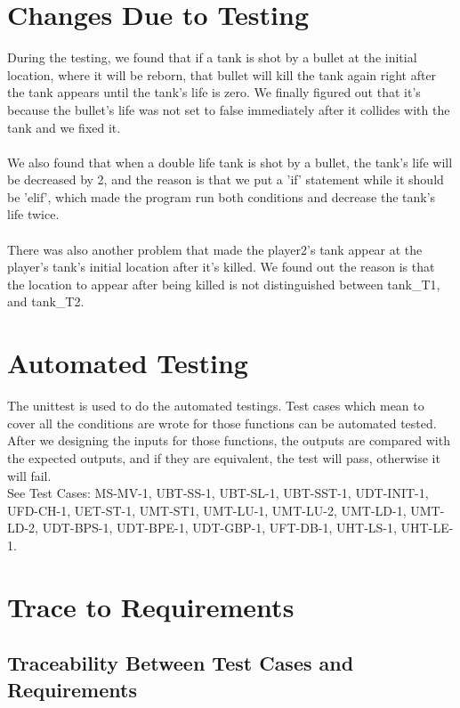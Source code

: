 \documentclass[12pt, titlepage]{article}
\begin{document}
\section{Changes Due to Testing}
During the testing, we found that if a tank is shot by a bullet at the initial location, where it will be reborn, that bullet will kill the tank again right after the tank appears until the tank's life is zero. We finally figured out that it's because the bullet's life was not set to false immediately after it collides with the tank and we fixed it.\\\\
We also found that when a double life tank is shot by a bullet, the tank's life will be decreased by 2, and the reason is that we put a 'if' statement while it should be 'elif', which made the program run both conditions and decrease the tank's life twice.\\\\
There was also another problem that made the player2's tank appear at the player's tank's initial location after it's killed. We found out the reason is that the location to appear after being killed is not distinguished between tank\_T1, and tank\_T2.
\section{Automated Testing}
The unittest is used to do the automated testings. Test cases which mean to cover all the conditions are wrote for those functions can be automated tested. After we designing the inputs for those functions, the outputs are compared with the expected outputs, and if they are equivalent, the test will pass, otherwise it will fail.\\
See Test Cases: MS-MV-1, UBT-SS-1, UBT-SL-1, UBT-SST-1, UDT-INIT-1, UFD-CH-1, UET-ST-1, UMT-ST1, UMT-LU-1, UMT-LU-2, UMT-LD-1, UMT-LD-2, UDT-BPS-1, UDT-BPE-1, UDT-GBP-1, UFT-DB-1, UHT-LS-1, UHT-LE-1.

\section{Trace to Requirements}

\subsection{Traceability Between Test Cases and Requirements}
\end{document}
